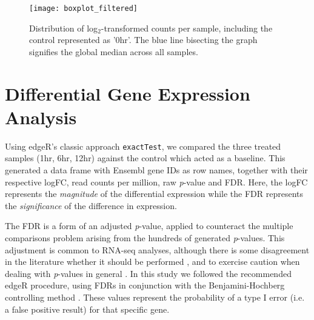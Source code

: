 \begin{figure}[!h]
    \centering
    \texttt{[image: boxplot\_filtered]}
    \caption{Distribution of log$_2$-transformed counts per sample, including the control represented as '0hr'. The blue line bisecting the graph signifies the global median across all samples.} 
    \label{fig:boxplot_filtered}
\end{figure}
\clearpage

\section{Differential Gene Expression Analysis}
Using edgeR's classic approach \texttt{exactTest}, we compared the three treated samples (1hr, 6hr, 12hr) against the control which acted as a baseline. This generated a data frame with Ensembl gene IDs as row names, together with their respective \ac{logFC}, read counts per million, raw \textit{p}-value and \ac{FDR}. Here, the \ac{logFC} represents the \textit{magnitude} of the differential expression while the \ac{FDR} represents the \textit{significance} of the difference in expression. 

The \ac{FDR} is a form of an adjusted \textit{p}-value, applied to counteract the multiple comparisons problem arising from the hundreds of generated \textit{p}-values. This adjustment is common to RNA-seq analyses, although there is some disagreement in the literature whether it should be performed \citep{rothman1990no, streiner2011correction}, and to exercise caution when dealing with \textit{p}-values in general \citep{gardner1986confidence, greenland2016statistical, vidgen2016p}. In this study we followed the recommended edgeR procedure, using \ac{FDR}s in conjunction with the Benjamini-Hochberg controlling method \citep{benjamini1995controlling}. These values represent the probability of a type I error (i.e. a false positive result) for that specific gene. %


